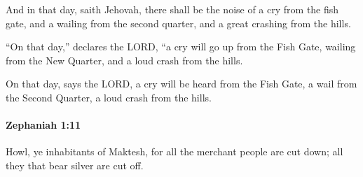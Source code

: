 			\begin{versebox}
					\item[BHS] 
					\item[LXX] 
					\item[ASV] And in that day, saith Jehovah, there shall be the noise of a cry from the fish gate, and a wailing from the second quarter, and a great crashing from the hills.
					\item[NIV] “On that day,” declares the LORD, “a cry will go up from the Fish Gate, wailing from the New Quarter, and a loud crash from the hills.
					\item[NRSV] On that day, says the LORD, a cry will be heard from the Fish Gate, a wail from the Second Quarter, a loud crash from the hills.
			\end{versebox}

		\paragraph{Zephaniah 1:11} %
			\label{ZEPHANIAH-1-11}

			Howl, ye inhabitants of Maktesh, for all the merchant people are cut down; all they that bear silver are cut off.

